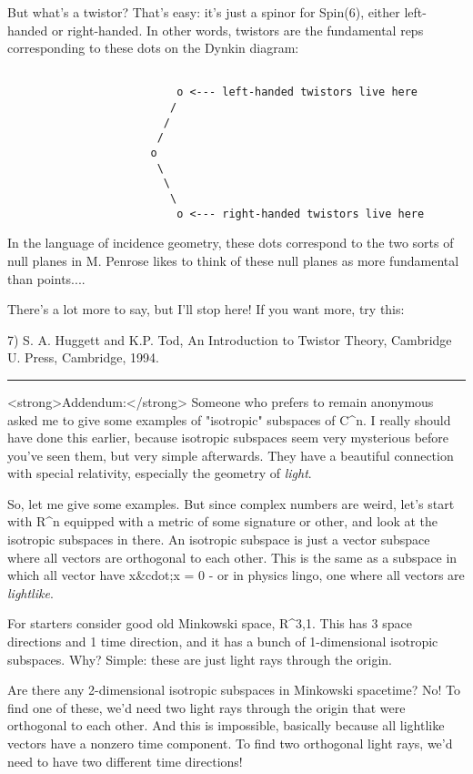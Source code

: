 But what's a twistor?  That's easy: it's just a spinor for Spin(6),
either left-handed or right-handed.  In other words, twistors are
the fundamental reps corresponding to these dots on the Dynkin
diagram:


\begin{verbatim}

                          o <--- left-handed twistors live here
                         /
                        /
                       /
                      o
                       \
                        \
                         \
                          o <--- right-handed twistors live here
\end{verbatim}
    
In the language of incidence geometry, these dots correspond to the two
sorts of null planes in M.  Penrose likes to think of these null planes
as more fundamental than points....

There's a lot more to say, but I'll stop here!  If you want more,
try this:

7) S. A. Huggett and K.P. Tod, An Introduction to Twistor Theory,
Cambridge U. Press, Cambridge, 1994.

\par\noindent\rule{\textwidth}{0.4pt}
<strong>Addendum:</strong> 
Someone who prefers to remain anonymous asked me to give some examples
of "isotropic" subspaces of C^{n}.  I really should have done this
earlier, because isotropic subspaces seem very mysterious before you've
seen them, but very simple afterwards.  They have a beautiful connection
with special relativity, especially the geometry of \emph{light}.


So, let me give some examples.  But since complex numbers are weird, let's
start with R^{n} 
equipped with a metric of some signature or other, and look
at the isotropic subspaces in there.  An isotropic subspace is just a
vector subspace where all vectors are orthogonal to each other.  This
is the same as a subspace in which all vector have x&cdot;x = 0 - or in 
physics lingo, one where all vectors are \emph{lightlike}.


For starters consider good old Minkowski space, R^{3,1}.  This has 3
space directions and 1 time direction, and it has a bunch of 1-dimensional
isotropic subspaces.  Why?  Simple: these are just light rays through the 
origin.


Are there any 2-dimensional isotropic subspaces in Minkowski spacetime?
No!  To find one of these, we'd need two light rays through the origin
that were orthogonal to each other.  And this is impossible, basically
because all lightlike vectors have a nonzero time component.  To find
two orthogonal light rays, we'd need to have two different time directions!


